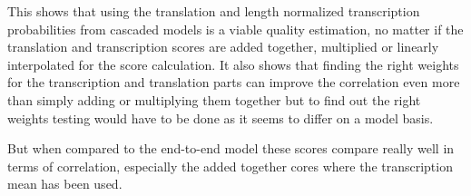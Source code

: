This shows that using the translation and length normalized transcription probabilities from cascaded models is a viable quality estimation, no matter if the translation and transcription scores are added together, multiplied or linearly interpolated for the score calculation. It also shows that finding the right weights for the transcription and translation parts can improve the correlation even more than simply adding or multiplying them together but to find out the right weights testing would have to be done as it seems to differ on a model basis.

But when compared to the end-to-end model these scores compare really well in terms of correlation, especially the added together cores where the transcription mean has been used. 



